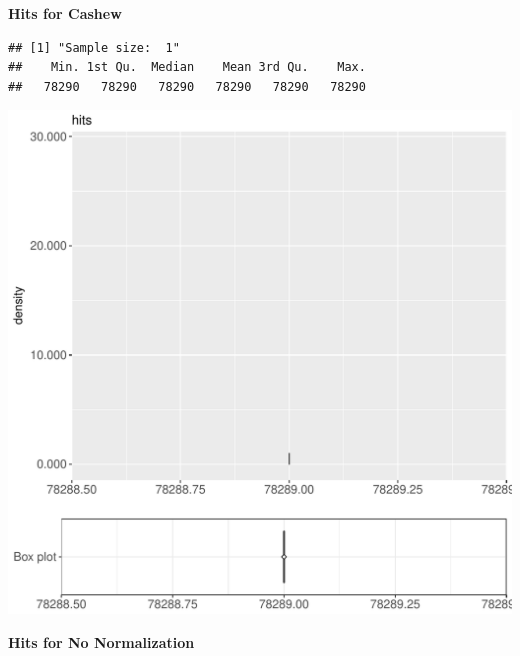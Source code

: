 \documentclass{article}\usepackage[]{graphicx}\usepackage[]{color}
\makeatletter
\def\maxwidth{ %
  \ifdim\Gin@nat@width>\linewidth
    \linewidth
  \else
    \Gin@nat@width
  \fi
}
\newenvironment{kframe}{%
 \def\at@end@of@kframe{}%
 \ifinner\ifhmode%
  \def\at@end@of@kframe{\end{minipage}}%
  \begin{minipage}{\columnwidth}%
 \fi\fi%
 \def\FrameCommand##1{\hskip\@totalleftmargin \hskip-\fboxsep
 \colorbox{shadecolor}{##1}\hskip-\fboxsep
     \hskip-\linewidth \hskip-\@totalleftmargin \hskip\columnwidth}%
 \MakeFramed {\advance\hsize-\width
   \@totalleftmargin\z@ \linewidth\hsize
   \@setminipage}}%
 {\par\unskip\endMakeFramed%
 \at@end@of@kframe}
\newenvironment{knitrout}{}{} %
\makeatother
\begin{document}
 \textbf{Hits for Cashew}
\begin{knitrout}
\color{fgcolor}\begin{kframe}
\begin{verbatim}
## [1] "Sample size:  1"
##    Min. 1st Qu.  Median    Mean 3rd Qu.    Max. 
##   78290   78290   78290   78290   78290   78290
\end{verbatim}


{\ttfamily\noindent\bfseries{}}\end{kframe}
\includegraphics[width=\maxwidth]{figure/RH3_cashew_crime-1} 

\end{knitrout}
 \textbf{Hits for No Normalization}
\end{document}
